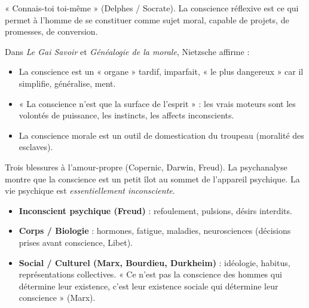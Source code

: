 \documentclass[11pt]{article}
\newcommand{\cle}[1]{{\popxbold\color{popdark}#1}}
\newcounter{popsec}
\newcounter{popsub}
\newcommand{\courssub}[1]{%
  \stepcounter{popsub}%
  \par\vspace{9pt}\noindent{\popxbold\fontsize{11.5}{13}\selectfont\color{popink}{\color{poporange}\thepopsec.\thepopsub}\hspace{6pt}#1}\par\nopagebreak\vspace{4pt}
}
\begin{document}
\begin{aretenir}
« Connais-toi toi-même » (Delphes / Socrate). La conscience réflexive est ce qui permet à l'homme de se constituer comme \cle{sujet moral}, capable de projets, de promesses, de conversion.
\end{aretenir}

\courssub{Limites de la conscience}

\begin{savaistu}
Dans \emph{Le Gai Savoir} et \emph{Généalogie de la morale}, Nietzsche affirme :
\begin{itemize}
\item La conscience est un « organe » tardif, imparfait, « le plus dangereux » car il simplifie, généralise, ment.
\item « La conscience n'est que la surface de l'esprit » : les vrais moteurs sont les \cle{volontés de puissance}, les instincts, les affects inconscients.
\item La conscience morale est un outil de domestication du troupeau (moralité des esclaves).
\end{itemize}
\end{savaistu}

\begin{savaistu}
Trois blessures à l'amour-propre (Copernic, Darwin, Freud). La psychanalyse montre que la conscience est un \cle{petit îlot} au sommet de l'appareil psychique. La vie psychique est \emph{essentiellement inconsciente}.
\end{savaistu}

\begin{aretenir}
\begin{itemize}
\item \textbf{Inconscient psychique (Freud)} : refoulement, pulsions, désirs interdits.
\item \textbf{Corps / Biologie} : hormones, fatigue, maladies, neurosciences (décisions prises avant conscience, Libet).
\item \textbf{Social / Culturel (Marx, Bourdieu, Durkheim)} : idéologie, habitus, représentations collectives. « Ce n'est pas la conscience des hommes qui détermine leur existence, c'est leur existence sociale qui détermine leur conscience » (Marx).
\end{itemize}
\end{aretenir}
\end{document}

